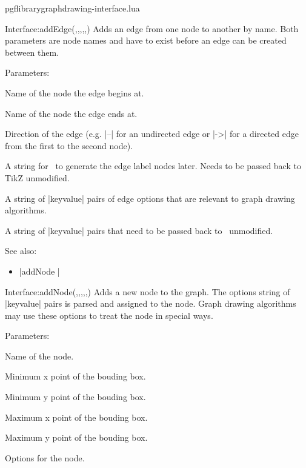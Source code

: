 
\begin{filedescription}{pgflibrarygraphdrawing-interface.lua}


\begin{luacommand}{{Interface:addEdge}(,,,,,)}
Adds an edge from one node to another by name.  Both parameters are node names and have to exist before an edge can be created between them. 

Parameters:
\begin{parameterdescription}
	\item[\meta{from}] Name of the node the edge begins at.\item[\meta{to}] Name of the node the edge ends at.\item[\meta{direction}] Direction of the edge (e.g. |--| for an undirected edge or |->| for a directed edge from the first to the second node).\item[\meta{edge\_nodes}] A string for \tikzname\ to generate the edge label nodes later. Needs to be passed back to TikZ unmodified.\item[\meta{options}] A string of |{key}{value}| pairs of edge options that are relevant to graph drawing algorithms.\item[\meta{tikz\_options}] A string of |{key}{value}| pairs that need to be passed back to \tikzname\ unmodified. 
\end{parameterdescription}



See also:
\begin{itemize}
	\item[] |addNode |
\end{itemize}

\end{luacommand}
\begin{luacommand}{{Interface:addNode}(,,,,,)}
Adds a new node to the graph.  The options string of |{key}{value}| pairs is parsed and assigned to the node. Graph drawing algorithms may use these options to treat the node in special ways. 

Parameters:
\begin{parameterdescription}
	\item[\meta{name}] Name of the node.\item[\meta{xMin}] Minimum x point of the bouding box.\item[\meta{yMin}] Minimum y point of the bouding box.\item[\meta{xMax}] Maximum x point of the bouding box.\item[\meta{yMax}] Maximum y point of the bouding box.\item[\meta{options}] Options for the node. 
\end{parameterdescription}




\end{luacommand}
\end{filedescription}
